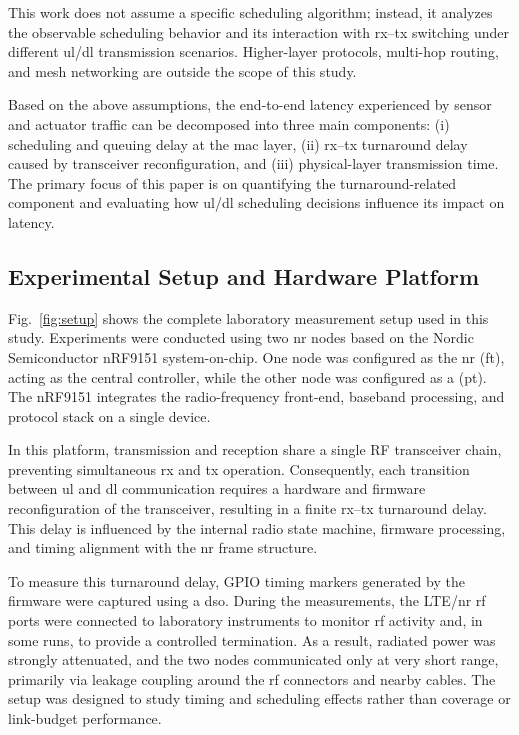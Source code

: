 \documentclass[conference]{IEEEtran}
\begin{document}
This work does not assume a specific scheduling algorithm; instead, it analyzes the observable scheduling behavior and its interaction with \gls{rx}--\gls{tx} switching under different \gls{ul}/\gls{dl} transmission scenarios. Higher-layer protocols, multi-hop routing, and mesh networking are outside the scope of this study.

Based on the above assumptions, the end-to-end latency experienced by sensor and actuator traffic can be decomposed into three main components: (i) scheduling and queuing delay at the \gls{mac} layer, (ii) \gls{rx}--\gls{tx} turnaround delay caused by transceiver reconfiguration, and (iii) physical-layer transmission time. The primary focus of this paper is on quantifying the turnaround-related component and evaluating how \gls{ul}/\gls{dl} scheduling decisions influence its impact on latency.


\subsection{Experimental Setup and Hardware Platform}

Fig.~\ref{fig:setup} shows the complete laboratory measurement setup used in this study. Experiments were conducted using two \gls{nr} nodes based on the Nordic Semiconductor nRF9151 system-on-chip. One node was configured as the \gls{nr} (\gls{ft}), acting as the central controller, while the other node was configured as a  (\gls{pt}). The nRF9151 integrates the radio-frequency front-end, baseband processing, and protocol stack on a single device.

In this platform, transmission and reception share a single RF transceiver chain, preventing simultaneous \gls{rx} and \gls{tx} operation. Consequently, each transition between \gls{ul} and \gls{dl} communication requires a hardware and firmware reconfiguration of the transceiver, resulting in a finite \gls{rx}--\gls{tx} turnaround delay. This delay is influenced by the internal radio state machine, firmware processing, and timing alignment with the \gls{nr} frame structure.

To measure this turnaround delay, GPIO timing markers generated by the firmware were captured using a \gls{dso}. During the measurements, the LTE/\gls{nr} \gls{rf} ports were connected to laboratory instruments to monitor \gls{rf} activity and, in some runs, to provide a controlled termination. As a result, radiated power was strongly attenuated, and the two nodes communicated only at very short range, primarily via leakage coupling around the \gls{rf} connectors and nearby cables. The setup was designed to study timing and scheduling effects rather than coverage or link-budget performance.
\end{document}
